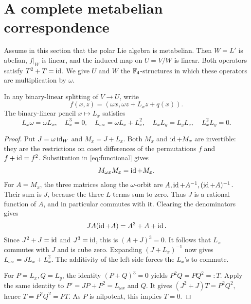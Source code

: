 \section{A complete metabelian correspondence}
\label{sec:metabelian}

Assume in this section that the polar Lie algebra is metabelian.
Then \(W=L'\) is abelian, \(f|_W\) is linear, and the induced map on
\(U=V/W\) is linear. Both operators satisfy \(T^2+T=\operatorname{id}\).
We give \(U\) and \(W\) the \(\mathbb F_4\)-structures in which these operators
are multiplication by \(\omega\).

\begin{lemma}\label{lem:operator-pencil}
In any binary-linear splitting of \(V\to U\), write
\begin{equation}\label{eq:preliminary-form}
 f(x,z)=(\omega x,\omega z+L_xz+q(x)).
\end{equation}
The binary-linear pencil \(x\mapsto L_x\) satisfies
\[
 L_x\omega=\omega L_x,\quad L_x^3=0,\quad
 L_{\omega x}=\omega L_x+L_x^2,\quad
 L_xL_y=L_yL_x,\quad L_x^2L_y=0.
\]
\end{lemma}
\begin{proof}
Put \(J=\omega\operatorname{id}_W\) and \(M_x=J+L_x\).
Both \(M_x\) and \(\operatorname{id}+M_x\) are invertible: they are the restrictions
on coset differences of the permutations \(f\) and \(f+\operatorname{id}=f^2\).
Substitution in \eqref{eq:functional} gives
\[
 M_{\omega x}M_x=\operatorname{id}+M_x.
\]
For \(A=M_x\), the three matrices along the \(\omega\)-orbit are
\(A,\operatorname{id}+A^{-1},(\operatorname{id}+A)^{-1}\). Their sum is \(J\), because the
three \(L\)-terms sum to zero. Thus \(J\) is a rational function of
\(A\), and in particular commutes with it. Clearing the denominators gives
\[
 JA(\operatorname{id}+A)=A^3+A+\operatorname{id}.
\]
Since \(J^2+J=\operatorname{id}\) and \(J^3=\operatorname{id}\), this is
\((A+J)^3=0\). It follows that \(L_x\) commutes with \(J\) and is
cube zero. Expanding \((J+L_x)^{-1}\) now gives
\(L_{\omega x}=JL_x+L_x^2\).
The additivity of the left side forces the \(L_x\)'s to commute.

For \(P=L_x,Q=L_y\), the identity \((P+Q)^3=0\) yields
\(P^2Q=PQ^2=:T\). Apply the same identity to
\(P'=JP+P^2=L_{\omega x}\) and \(Q\). It gives
\((J^2+J)T=P^2Q^2\), hence \(T=P^2Q^2=PT\).
As \(P\) is nilpotent, this implies \(T=0\).
\end{proof}

